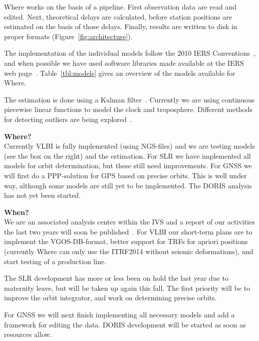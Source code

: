 Where works on the basis of a pipeline. First observation data are read and
edited. Next, theoretical delays are calculated, before station positions are
estimated on the basis of those delays. Finally, results are written to disk in
proper formats (Figure~\ref{fig:architecture}).

The implementation of the individual models follow the 2010 IERS
Conventions~\cite{iers2010}, and when possible we have used software libraries
made available at the IERS web page~\cite{iers_software}. Table~\ref{tbl:models}
gives an overview of the models available for Where.

The estimation is done using a Kalman filter~\cite{mysen2017}. Currently we are
using continuous piecewise linear functions to model the clock and troposphere.
Different methods for detecting outliers are being explored~\cite{mysen2017b}.


{\large\bfseries Where?}\\

Currently VLBI is fully implemented (using NGS-files) and we are testing models
(see the box on the right) and the estimation. For SLR we have implemented all
models for orbit determination, but these still need improvements. For GNSS we
will first do a PPP-solution for GPS based on precise orbits. This is well under
way, although some models are still yet to be implemented. The DORIS analysis
has not yet been started.


{\large\bfseries When?}\\

We are an associated analysis center within the IVS and a report of our
activities the last two years will soon be published~\cite{kirkvik2017}. For
VLBI our short-term plans are to implement the VGOS-DB-format, better support
for TRFs for apriori positions (currently Where can only use the ITRF2014
without seismic deformations), and start testing of a production line.

The SLR development has more or less been on hold the last year due to maternity
leave, but will be taken up again this fall. The first priority will be to
improve the orbit integrator, and work on determining precise orbits.

For GNSS we will next finish implementing all necessary models and add a framework
for editing the data. DORIS development will be started as soon as resources allow.

\endinput
